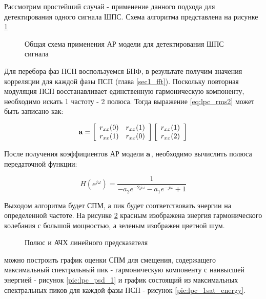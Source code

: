 Рассмотрим простейший случай - применение данного подхода для детектирования одного сигнала ШПС.
Схема алгоритма представлена на рисунке \ref{pic:lpc_basic}

\begin{figure}[H]
	\center{}
	\caption{Общая схема применения АР модели для детектирования ШПС сигнала}
	\label{pic:lpc_basic}
\end{figure}
Для перебора фаз ПСП воспользуемся БПФ, в результате получим значения корреляции для каждой фазы ПСП (глава \ref{sec1_fft}).
Поскольку повторная модуляция ПСП восстанавливает единственную гармоническую компоненту,
необходимо искать 1 частоту - 2 полюса.
Тогда выражение \ref{eq:lpc_rms2} может быть записано как:
\begin{center}
\begin{equation}
	\label{eq:lpc_gps_1}
	{\bf a} = 
		\left[ \begin{array}{cc}
			r_{xx}(0) & r_{xx}(1) \\
			r_{xx}(1) & r_{xx}(0)
		\end{array} \right]
		\left[ \begin{array}{c}
			r_{xx}(1) \\
			r_{xx}(2)
		\end{array} \right]
\end{equation}
\end{center}

После получения коэффициентов АР модели ${\bf{a}}$, необходимо вычислить полюса передаточной функции:
\begin{center}
\begin{equation}
	\label{eq:lpc_spectral_func}
	H(e^{j \omega}) = \frac{1}{-a_2 e^{-2j \omega} - a_1e^{-j \omega} + 1}
\end{equation}
\end{center}

Выходом алгоритма будет СПМ, а пик будет соответствовать энергии на определенной частоте. На рисунке
\ref{pic:lpc_poles_gps} красным изображена энергия гармонического колебания с большой мощностью, а
зеленым изображен цветной шум.
\begin{figure}[H]
	\center{}
	\caption{Полюс и АЧХ линейного предсказателя}
	\label{pic:lpc_poles_gps}
\end{figure}


можно построить график оценки СПМ для смещения,
содержащего максимальный спектральный пик - гармоническую компоненту
с наивысшей энергией - рисунок \ref{pic:lpc_psd_1} и график состоящий из максимальных спектральных пиков для каждой фазы
ПСП - рисунок \ref{pic:lpc_1sat_energy}.

